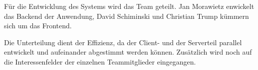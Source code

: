 

Für die Entwicklung des Systems wird das Team geteilt. Jan Morawietz enwickelt das Backend der Anwendung, David Schiminski und Christian Trump kümmern sich um das Frontend.

Die Unterteilung dient der Effizienz, da der Client- und der Serverteil parallel entwickelt und aufeinander abgestimmt werden können. Zusätzlich wird noch auf die Interessenfelder der einzelnen Teammitglieder eingegangen.
